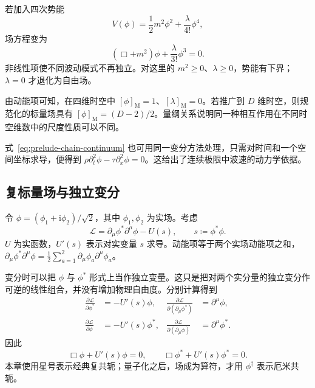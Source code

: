 若加入四次势能
\begin{equation}
  V(\phi)=\frac12m^{2}\phi^{2}+\frac{\lambda}{4!}\phi^{4},
\end{equation}
场方程变为
\begin{equation}
  (\Box+m^{2})\phi+\frac{\lambda}{3!}\phi^{3}=0.
\end{equation}
非线性项使不同波动模式不再独立。对这里的 $m^{2}\geq0$、$\lambda\geq0$，势能有下界；$\lambda=0$ 才退化为自由场。

由动能项可知，在四维时空中 $[\phi]_{\mathrm{M}}=1$、$[\lambda]_{\mathrm{M}}=0$。若推广到 $D$ 维时空，则规范化的标量场具有
$[\phi]_{\mathrm{M}}=(D-2)/2$。量纲关系说明同一种相互作用在不同时空维数中的尺度性质可以不同。

式~\eqref{eq:prelude-chain-continuum} 也可用同一变分方法处理，只需对时间和一个空间坐标求导，便得到
$\rho\partial_{t}^{2}\phi-\tau\partial_{x}^{2}\phi=0$。这给出了连续极限中波速的动力学依据。

\subsection{复标量场与独立变分}

令 $\phi=(\phi_{1}+\mathrm{i}\phi_{2})/\sqrt2$，其中 $\phi_{1},\phi_{2}$ 为实场。考虑
\begin{equation}
  \mathcal{L}=\partial_{\mu}\phi^{*}\partial^{\mu}\phi-U(s),
  \qquad s\coloneqq\phi^{*}\phi.
  \label{eq:prelude-complex-lagrangian}
\end{equation}
$U$ 为实函数，$U'(s)$ 表示对实变量 $s$ 求导。动能项等于两个实场动能项之和，
$\partial_{\mu}\phi^{*}\partial^{\mu}\phi
=\tfrac12\sum_{a=1}^{2}\partial_{\mu}\phi_{a}\partial^{\mu}\phi_{a}$。

变分时可以把 $\phi$ 与 $\phi^{*}$ 形式上当作独立变量。这只是把对两个实分量的独立变分作可逆的线性组合，并没有增加物理自由度。分别计算得到
\begin{align}
  \frac{\partial\mathcal{L}}{\partial\phi^{*}}&=-U'(s)\phi,
  &\frac{\partial\mathcal{L}}{\partial(\partial_{\mu}\phi^{*})}&=\partial^{\mu}\phi,\\
  \frac{\partial\mathcal{L}}{\partial\phi}&=-U'(s)\phi^{*},
  &\frac{\partial\mathcal{L}}{\partial(\partial_{\mu}\phi)}&=\partial^{\mu}\phi^{*}.
\end{align}
因此
\begin{equation}
  \Box\phi+U'(s)\phi=0,\qquad
  \Box\phi^{*}+U'(s)\phi^{*}=0.
  \label{eq:prelude-complex-equation}
\end{equation}
本章使用星号表示经典复共轭；量子化之后，场成为算符，才用 $\phi^{\dagger}$ 表示厄米共轭。

